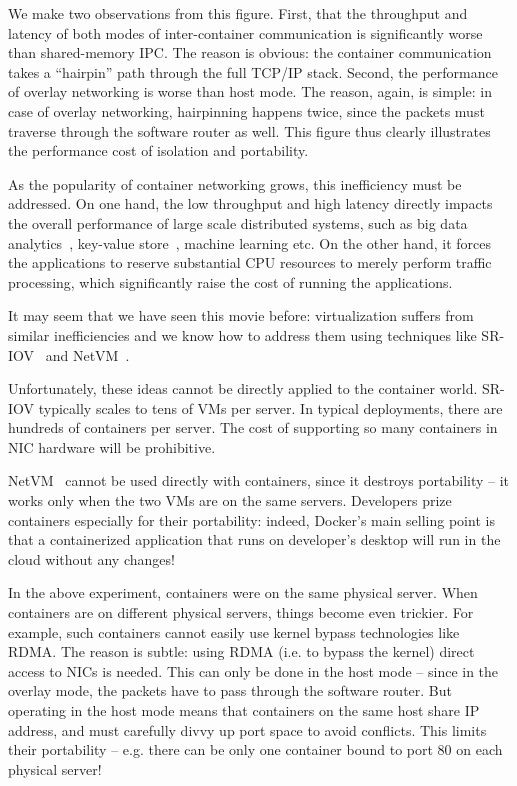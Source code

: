 We make two observations from this figure. First, that the throughput and
latency of both modes of inter-container communication is significantly worse
than shared-memory IPC. The reason is obvious: the container communication takes
a ``hairpin'' path through the full TCP/IP stack. Second,
the performance of overlay networking is worse than host mode. The reason, again,
is simple: in case of overlay networking, hairpinning happens twice, since the
packets must traverse through the software router as well. This figure thus
clearly illustrates the performance cost of isolation and portability.

As the popularity of container networking grows, this inefficiency must be
addressed. On one hand, the low throughput and high latency directly impacts
the overall performance of large scale distributed systems, such as big data
analytics~\cite{choudhury-paper}, key-value store~\cite{farm}, machine learning
etc.  On the other hand, it forces the applications to reserve substantial CPU
resources to merely perform traffic processing, which significantly raise the
cost of running the applications.

It may seem that we have seen this movie before: virtualization suffers from
similar inefficiencies and we know how to address them using techniques like
SR-IOV~\cite{sriov} and NetVM~\cite{netvm}.

Unfortunately, these ideas cannot be directly applied to the container world.
SR-IOV typically scales to tens of VMs per server. In typical deployments, there
are hundreds of containers per server. The cost of supporting so many containers
in NIC hardware will be prohibitive. 

NetVM~\cite{netvm} cannot be used directly with containers, since it destroys
portability -- it works only when the two VMs are on the same servers.
Developers prize containers especially for their portability: indeed, Docker's
main selling point is that a containerized application that runs on developer's
desktop will run in the cloud without any changes! 

In the above experiment, containers were on the same physical server. When
containers are on different physical servers, things become even trickier. For
example, such containers cannot easily use kernel bypass technologies like RDMA.
The reason is subtle: using RDMA (i.e. to bypass the kernel) direct access to
NICs is needed. This can only be done in the host mode -- since in the overlay
mode, the packets have to pass through the software router.  But operating in
the host mode means that containers on the same host share IP address, and must
carefully divvy up port space to avoid conflicts.  This limits their portability
-- e.g. there can be only one container bound to port 80 on each physical
server!

